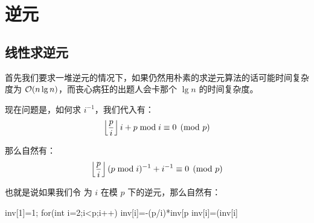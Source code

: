 \section{逆元}
\label{sec:逆元}



\subsection{线性求逆元}
首先我们要求一堆逆元的情况下，如果仍然用朴素的求逆元算法的话可能时间复杂度为
$\mathcal{O}(n \lg n)$，而丧心病狂的出题人会卡那个 $\lg n$ 的时间复杂度。

现在问题是，如何求 $i^{-1}$，我们代入有：\[
    \left\lfloor{p \over i}\right\rfloor i + p \bmod i \equiv 0 \pmod p
\]

那么自然有：\[
    \left\lfloor{p \over i}\right\rfloor (p \bmod i)^{-1} + i^{-1} \equiv 0 \pmod p
\]

也就是说如果我们令  为 $i$ 在模 $p$ 下的逆元，那么自然有：
\begin{Cpp}
{
  inv[1]=1;
  for(int i=2;i<p;i++){
    inv[i]=-(p/i)*inv[p%
    inv[i]=(inv[i]%
  }
}
\end{Cpp}
